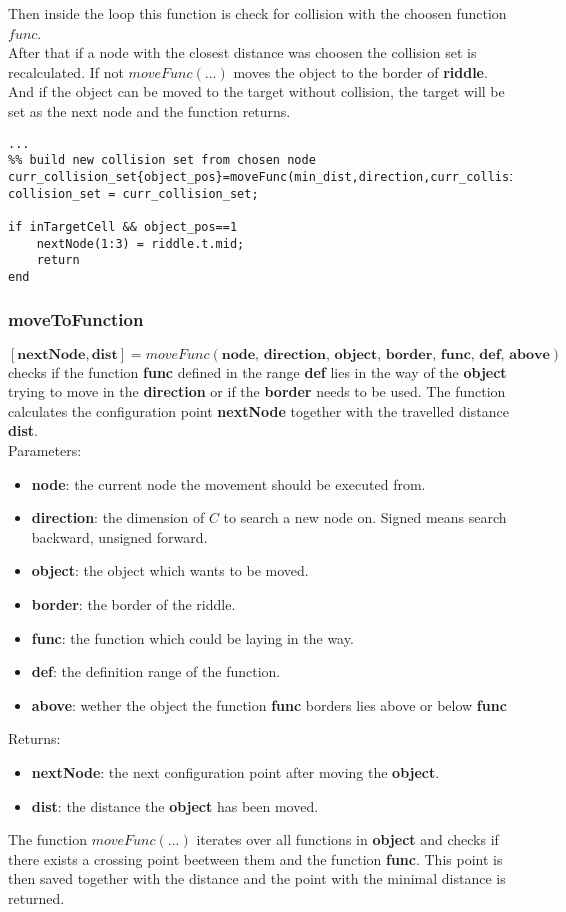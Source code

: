 Then inside the loop this function is check for collision with the choosen function $func$.\\
After that if a node with the closest distance was choosen the collision set is recalculated. If not $moveFunc(...)$ moves the object to the border of \textbf{riddle}.
And if the object can be moved to the target without collision, the target will be set as the next node and the function returns.
\begin{lstlisting}
...
%% build new collision set from chosen node
curr_collision_set{object_pos}=moveFunc(min_dist,direction,curr_collision_set{object_pos});
collision_set = curr_collision_set;

if inTargetCell && object_pos==1
    nextNode(1:3) = riddle.t.mid;
    return
end
\end{lstlisting}

\subsubsection{moveToFunction}
$[\textbf{nextNode},\textbf{dist}]=moveFunc(\textbf{node, direction, object, border, func, def, above})$ checks if the function \textbf{func} defined in the range \textbf{def} lies in the way of the \textbf{object} trying to move in the \textbf{direction} or if the \textbf{border} needs to be used. The function calculates the configuration point \textbf{nextNode} together with the travelled distance \textbf{dist}.\\
Parameters:
\begin{itemize}
\item \textbf{node}: the current node the movement should be executed from.
\item \textbf{direction}: the dimension of $C$ to search a new node on. Signed means search backward, unsigned forward. 
\item \textbf{object}: the object which wants to be moved.
\item \textbf{border}: the border of the riddle.
\item \textbf{func}: the function which could be laying in the way.
\item \textbf{def}: the definition range of the function.
\item \textbf{above}: wether the object the function \textbf{func} borders lies above or below \textbf{func}
\end{itemize}
Returns:
\begin{itemize}
\item \textbf{nextNode}: the next configuration point after moving the \textbf{object}.
\item \textbf{dist}: the distance the \textbf{object} has been moved.
\end{itemize}
The function $moveFunc(...)$ iterates over all functions in \textbf{object} and checks if there exists a crossing point beetween them and the function \textbf{func}.
This point is then saved together with the distance and the point with the minimal distance is returned.\\
